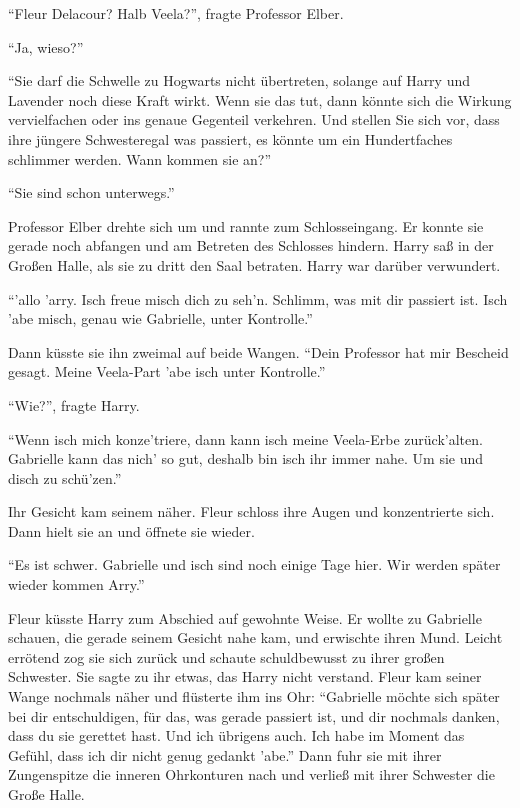 \enquote{Fleur Delacour? Halb Veela?}, fragte Professor Elber.

\enquote{Ja, wieso?}

\enquote{Sie darf die Schwelle zu Hogwarts nicht übertreten, solange auf Harry und Lavender noch diese Kraft wirkt. Wenn sie das tut, dann könnte sich die Wirkung vervielfachen \gst oder ins genaue Gegenteil verkehren. \gst Und \gst stellen Sie sich vor, dass ihre jüngere Schwester\abs egal was passiert, es könnte um ein Hundertfaches schlimmer werden. \gst Wann kommen sie an?}

\enquote{Sie sind schon unterwegs.}

Professor Elber drehte sich um und rannte zum Schlosseingang. Er konnte sie gerade noch abfangen und am Betreten des Schlosses hindern. Harry saß in der Großen Halle, als sie zu dritt den Saal betraten. Harry war darüber verwundert.

\enquote{'allo 'arry. Isch freue misch dich zu seh'n. Schlimm, was mit dir passiert ist. Isch 'abe misch, genau wie Gabrielle, unter Kontrolle.}

Dann küsste sie ihn zweimal auf beide Wangen. \enquote{Dein Professor hat mir Bescheid gesagt. Meine Veela-Part 'abe isch unter Kontrolle.}

\enquote{Wie?}, fragte Harry.

\enquote{Wenn isch mich konze'triere, dann kann isch meine Veela-Erbe zurück'alten. Gabrielle kann das nich' so gut, deshalb bin isch ihr immer nahe. Um sie und disch zu schü'zen.}

Ihr Gesicht kam seinem näher. Fleur schloss ihre Augen und konzentrierte sich. Dann hielt sie an und öffnete sie wieder.

\enquote{Es ist schwer. Gabrielle und isch sind noch einige Tage hier. Wir werden später wieder kommen Arry.}

Fleur küsste Harry zum Abschied auf gewohnte Weise. Er wollte zu Gabrielle schauen, die gerade seinem Gesicht nahe kam, und erwischte ihren Mund. Leicht errötend zog sie sich zurück und schaute schuldbewusst zu ihrer großen Schwester. Sie sagte zu ihr etwas, das Harry nicht verstand. Fleur kam seiner Wange nochmals näher und flüsterte ihm ins Ohr: \enquote{Gabrielle möchte sich später bei dir entschuldigen, für das, was gerade passiert ist, und dir nochmals danken, dass du sie gerettet hast. Und ich übrigens auch. Ich habe im Moment das Gefühl, dass ich dir nicht genug gedankt 'abe.} Dann fuhr sie mit ihrer Zungenspitze die inneren Ohrkonturen nach und verließ mit ihrer Schwester die Große Halle.


